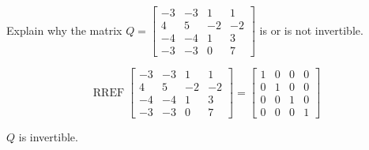 
\begin{exerciseStatement}


Explain why the matrix \(Q= \left[\begin{array}{cccc}
-3 & -3 & 1 & 1 \\
4 & 5 & -2 & -2 \\
-4 & -4 & 1 & 3 \\
-3 & -3 & 0 & 7
\end{array}\right] \) is or is not invertible.


\end{exerciseStatement}
    
\begin{exerciseAnswer} 


\[\operatorname{RREF} \left[\begin{array}{cccc}
-3 & -3 & 1 & 1 \\
4 & 5 & -2 & -2 \\
-4 & -4 & 1 & 3 \\
-3 & -3 & 0 & 7
\end{array}\right] = \left[\begin{array}{cccc}
1 & 0 & 0 & 0 \\
0 & 1 & 0 & 0 \\
0 & 0 & 1 & 0 \\
0 & 0 & 0 & 1
\end{array}\right] \]

\(Q\) is invertible.
\end{exerciseAnswer}
    
